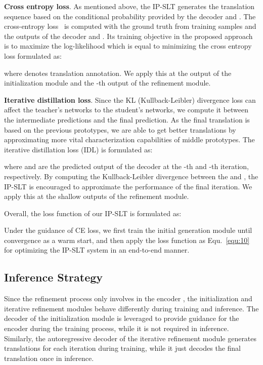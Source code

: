 \documentclass[10pt,twocolumn,letterpaper]{article}
\begin{document}
    \smallskip
    \noindent \textbf{Cross entropy loss}.
    As mentioned above, the IP-SLT generates the translation sequence based on the conditional probability provided by the decoder  and . The cross-entropy loss~\cite{vaswani2017attention} is computed with the ground truth from  training samples and the outputs of the decoder  and . Its training objective in the proposed approach is to maximize the log-likelihood which is equal to minimizing the cross entropy loss formulated as:\vspace{-1mm}
    
    where  denotes translation annotation.
    We apply this at the output of the initialization module and the -th output of the refinement module.

    \smallskip
    \noindent \textbf{Iterative distillation loss}.
    Since the KL (Kullback-Leibler) divergence loss can affect the teacher's networks to the student's networks, we compute it between the  intermediate predictions and the final prediction. As the final translation is based on the previous prototypes, we are able to get better translations by approximating more vital characterization capabilities of middle prototypes. The iterative distillation loss (IDL) is formulated  as:
    
    where  and  are the predicted output of the decoder  at the -th and -th iteration, respectively. 
    By computing the Kullback-Leibler divergence between the  and , the IP-SLT is encouraged to approximate the performance of the final iteration.
    We apply this at the  shallow outputs of the refinement module.
    
    Overall, the loss function of our IP-SLT is formulated as:
    
    Under the guidance of CE loss, we first train the initial generation module until convergence as a warm start, and then apply the loss function as Equ.~\eqref{equ:10} for optimizing the IP-SLT system in an end-to-end manner. 

    \subsection{Inference Strategy}
    Since the refinement process only involves in the encoder , the initialization and iterative refinement modules behave differently during training and inference. The decoder  of the initialization module is leveraged to provide guidance for the encoder  during the training process, while it is not required in inference. Similarly, the autoregressive decoder  of the iterative refinement module generates translations for each iteration during training, while it just decodes the final translation once in inference.
\end{document}
